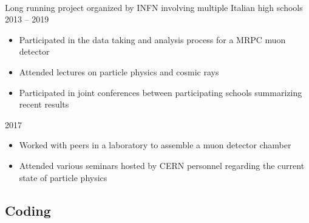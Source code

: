 \documentclass{res}[12pt] %
\begin{document}
\begin{resume}
 \\ Long running project organized by INFN involving multiple Italian high schools \hfill 2013 -- 2019
\begin{itemize}
\item Participated in the data taking and analysis process for a MRPC muon detector
\item Attended lectures on particle physics and cosmic rays
\item Participated in joint conferences between participating schools summarizing recent results
\end{itemize}

 \href{https://github.com/jacopouggeri/curriculumVitae/blob/84ad9712112b11ea237b126a98ba1764b27054b4/attachments/eee.pdf}{\attachment} \hfill 2017
\begin{itemize}
\item Worked with peers in a laboratory to assemble a muon detector chamber
\item Attended various seminars hosted by CERN personnel regarding the current state of particle physics
\end{itemize}

 

\newpage
{}
\sectionRule
\vspace{6pt} %

\subsection*{\faTerminal \hspace{3pt} Coding}



\end{resume}
\end{document}
